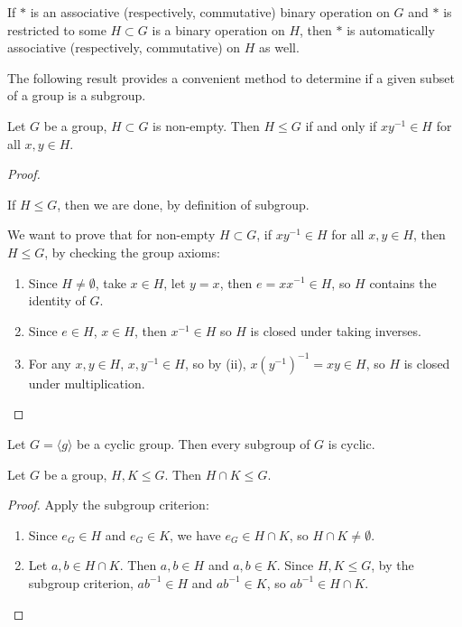 \begin{remark}
If $\ast$ is an associative (respectively, commutative) binary operation on $G$ and $\ast$ is restricted to some $H\subset G$ is a binary operation on $H$, then $\ast$ is automatically associative (respectively, commutative) on $H$ as well.
\end{remark}

The following result provides a convenient method to determine if a given subset of a group is a subgroup.

\begin{lemma}
Let $G$ be a group, $H\subset G$ is non-empty. Then $H\le G$ if and only if $xy^{-1}\in H$ for all $x,y\in H$. 
\end{lemma}

\begin{proof} \

\fbox{$\implies$} If $H\le G$, then we are done, by definition of subgroup.

\fbox{$\impliedby$} We want to prove that for non-empty $H\subset G$, if $xy^{-1}\in H$ for all $x,y\in H$, then $H\le G$, by checking the group axioms:
\begin{enumerate}[label=(\roman*)]
\item Since $H\neq\emptyset$, take $x\in H$, let $y=x$, then $e=xx^{-1}\in H$, so $H$ contains the identity of $G$.
\item Since $e\in H$, $x\in H$, then $x^{-1}\in H$ so $H$ is closed under taking inverses.
\item For any $x,y\in H$, $x,y^{-1}\in H$, so by (ii), $x(y^{-1})^{-1}=xy\in H$, so $H$ is closed under multiplication.
\end{enumerate}
\end{proof}

\begin{proposition}
Let $G=\langle g\rangle$ be a cyclic group. Then every subgroup of $G$ is cyclic.
\end{proposition}

\begin{proposition}
Let $G$ be a group, $H,K\le G$. Then $H\cap K\le G$.
\end{proposition}

\begin{proof}
Apply the subgroup criterion:
\begin{enumerate}[label=(\roman*)]
\item Since $e_G\in H$ and $e_G\in K$, we have $e_G\in H\cap K$, so $H\cap K\neq\emptyset$.
\item Let $a,b\in H\cap K$. Then $a,b\in H$ and $a,b\in K$. Since $H,K\le G$, by the subgroup criterion, $ab^{-1}\in H$ and $ab^{-1}\in K$, so $ab^{-1}\in H\cap K$.
\end{enumerate}
\end{proof}

